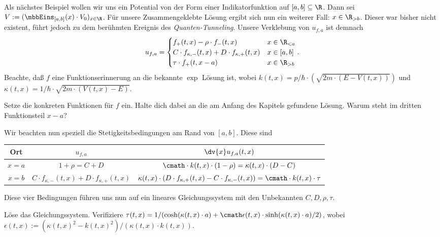 \documentclass{subfiles}
\begin{document}
    Als nächstes Beispiel wollen wir uns ein Potential von der Form einer Indikatorfunktion auf $[a,b]\subseteq\R$. Dann sei $V:=(\mbbEins_{[a,b]}(x)\cdot V_0)_{x\in\R}$. Für unsere Zusammengeklebte Lösung ergibt sich nun ein weiterer Fall: $x\in\R_{>b}$. Dieser war bisher nicht existent, führt jedoch zu dem berühmten Ereignis des \emph{Quanten-Tunneling}. Unsere Verklebung von $u_{f,a}$ ist demnach 
    \[
        u_{f,a} = \begin{cases}
            f_+(t,x) - \rho\cdot f_-(t,x) & x\in\R_{<a}\\
            C\cdot f_{\kappa,-}(t,x) + D\cdot f_{\kappa,+}(t,x) & x\in[a,b]\\
            \tau\cdot f_+(t,x - a) & x\in\R_{>b}
        \end{cases}.
    \]
    Beachte, daß $f$ eine Funktionserinnerung an die bekannte $\exp$ Lösung ist, wobei $k(t,x) =p/\hbar\cdot(\sqrt{2m\cdot (E-V(t,x))})$ und $\kappa(t,x) = 1/\hbar\cdot\sqrt{2m\cdot (V(t,x) - E)}$. 
    \begin{Aufgabe}
        \nr{} Setze die konkreten Funktionen für $f$ ein. Halte dich dabei an die am Anfang des Kapitels gefundene Lösung. Warum steht im dritten Funktionsteil $x-a$?
    \end{Aufgabe}
    Wir beachten nun speziell die Stetigkeitsbedingungen am Rand von $[a,b]$. Diese sind
    \begin{table}
        \centering
        \begin{tabular}{c|c|c}
            Ort & $u_{f,a}$ & $\dv{x}u_{f,a}(t,x)$ \\
            \hline
            $x = a$ & $1+\rho = C + D$ & $\cmath\cdot k(t,x)\cdot (1-\rho) = \kappa(t,x)\cdot (D - C)$ \\
            $x = b$ & $C\cdot f_{\kappa,-}(t,x) + D\cdot f_{\kappa,+}(t,x)$ & $\kappa(t,x)\cdot(D\cdot f_{\kappa,+}(t,x) - C\cdot f_{\kappa,-}(t,x)) = \cmath\cdot k(t,x)\cdot \tau$ \\
        \end{tabular}
    \end{table}
    Diese vier Bedingungen führen uns nun auf ein lineares Gleichungssystem mit den Unbekannten $C,D,\rho,\tau$.
    \begin{Aufgabe}
        \nr{} Löse das Gleichungssystem. Verifiziere $\tau(t,x) = 1/(\cosh(\kappa(t,x)\cdot a) + \cmath\epsilon(t,x)\cdot\sinh(\kappa(t,x)\cdot a)/2)$, wobei $\epsilon(t,x):=(\kappa(t,x)^2-k(t,x)^2)/(\kappa(t,x)\cdot k(t,x))$.
    \end{Aufgabe}
\end{document}
